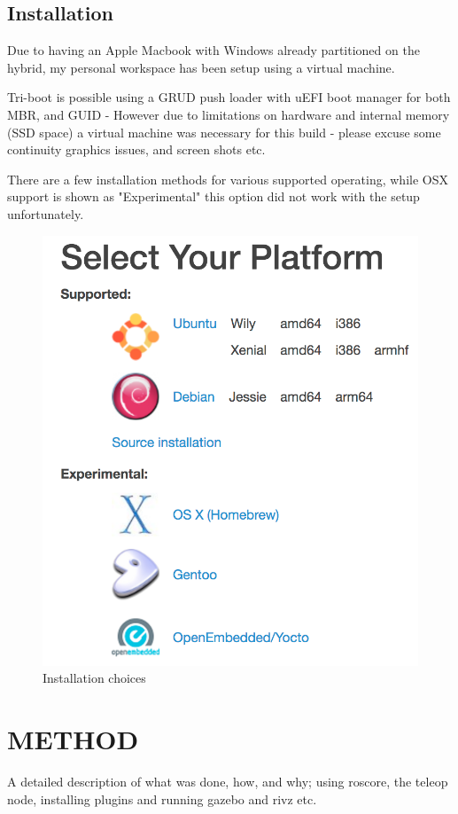 \documentclass[a4paper, 10pt]{IEEEconf}
\begin{document}

\subsection{Installation}

Due to having an Apple Macbook with Windows already partitioned on the hybrid, my personal workspace has been setup using a virtual machine. 

Tri-boot is possible using a GRUD push loader with uEFI boot manager for both MBR, and GUID - However due to limitations on hardware and internal memory (SSD space) a virtual machine was necessary for this build - please excuse some continuity graphics issues, and screen shots etc.

There are a few installation methods for various supported operating, while OSX support is shown as "Experimental" this option did not work with the setup unfortunately.

\begin{figure}[H]
  \includegraphics[width=0.5\linewidth, center]{images/Install}
  \caption{Installation choices}
  \label{fig:Installation choices}
\end{figure}

\clearpage
\section{METHOD}
A detailed description of what was done, how, and why; using roscore, the teleop node, installing plugins and running gazebo and rivz etc.
\end{document}
